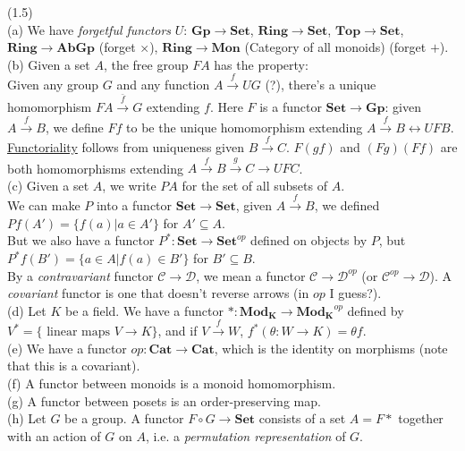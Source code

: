 \documentclass[a4paper]{article}
\begin{document}
\begin{eg} (1.5)\\
    (a) We have \emph{forgetful functors} $U$: $\mathbf{Gp} \to \mathbf{Set}$, $\mathbf{Ring}\to \mathbf{Set}$, $\mathbf{Top} \to \mathbf{Set}$, $\mathbf{Ring} \to \mathbf{AbGp}$ (forget $\times$), $\mathbf{Ring} \to \mathbf{Mon}$ (Category of all monoids) (forget $+$).\\
    (b) Given a set $A$, the free group $FA$ has the property:\\
    Given any group $G$ and any function $A \xrightarrow{f} UG$ (?), there's a unique homomorphism $FA \xrightarrow{\bar{f}} G$ extending $f$. Here $F$ is a functor $\mathbf{Set}\to \mathbf{Gp}$: given $A \xrightarrow{f} B$, we define $Ff$ to be the unique homomorphism extending $A \xrightarrow{f} B \leftrightarrow UFB$. \href{https://math.stackexchange.com/questions/1922113/what-exactly-is-functoriality}{Functoriality} follows from uniqueness given $B \xrightarrow{f} C$. $F(gf)$ and $(Fg)(Ff)$ are both homomorphisms extending $A \xrightarrow{f} B \xrightarrow{g} C \rightarrow UFC$.\\
    (c) Given a set $A$, we write $PA$ for the set of all subsets of $A$.\\
    We can make $P$ into a functor $\mathbf{Set} \to \mathbf{Set}$, given $A \xrightarrow{f} B$, we defined $Pf(A') = \{f(a) | a \in A'\}$ for $A' \subseteq A$.\\
    But we also have a functor $P^* : \mathbf{Set} \to \mathbf{Set}^{op}$ defined on objects by $P$, but $P^* f(B') = \{a \in A | f(a) \in B'\}$ for $B' \subseteq B$.\\
    By a \emph{contravariant} functor $\mathcal{C} \to \mathcal{D}$, we mean a functor $\mathcal{C} \to \mathcal{D}^{op}$ (or $\mathcal{C}^{op} \to \mathcal{D}$). A \emph{covariant} functor is one that doesn't reverse arrows (in $op$ I guess?).\\
    (d) Let $K$ be a field. We have a functor $*:\mathbf{Mod_K} \to \mathbf{Mod_K}^{op}$ defined by $V^* = \{ \text{ linear maps }  V \to K\}$, and if $V \xrightarrow{f} W$, $f^*(\theta:W \to K) = \theta f$.\\
    (e) We have a functor $op: \mathbf{Cat} \to \mathbf{Cat}$, which is the identity on morphisms (note that this is a covariant).\\
    (f) A functor between monoids is a monoid homomorphism.\\
    (g) A functor between posets is an order-preserving map.\\
    (h) Let $G$ be a group. A functor $F \circ G \to \mathbf{Set}$ consists of a set $A=F*$ together with an action of $G$ on $A$, i.e. a \emph{permutation representation} of $G$.\\

\end{eg}
\end{document}
